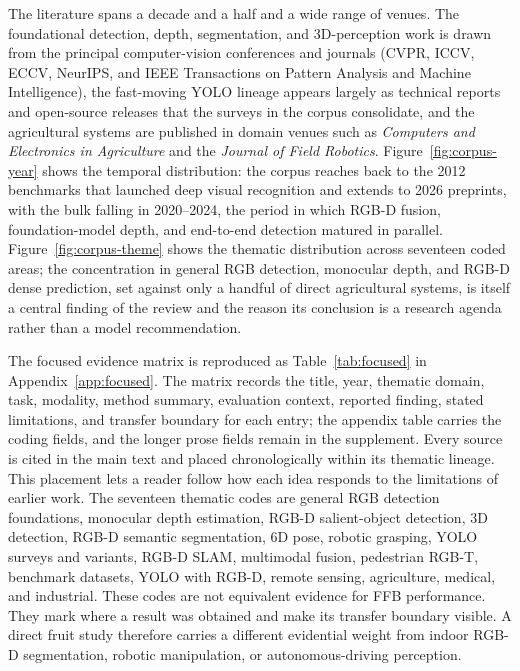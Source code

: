 The literature spans a decade and a half and a wide range of venues. The foundational detection, depth, segmentation, and 3D-perception work is drawn from the principal computer-vision conferences and journals (CVPR, ICCV, ECCV, NeurIPS, and IEEE Transactions on Pattern Analysis and Machine Intelligence), the fast-moving YOLO lineage appears largely as technical reports and open-source releases that the surveys in the corpus consolidate, and the agricultural systems are published in domain venues such as \emph{Computers and Electronics in Agriculture} and the \emph{Journal of Field Robotics}. Figure~\ref{fig:corpus-year} shows the temporal distribution: the corpus reaches back to the 2012 benchmarks that launched deep visual recognition and extends to 2026 preprints, with the bulk falling in 2020--2024, the period in which RGB-D fusion, foundation-model depth, and end-to-end detection matured in parallel. Figure~\ref{fig:corpus-theme} shows the thematic distribution across seventeen coded areas; the concentration in general RGB detection, monocular depth, and RGB-D dense prediction, set against only a handful of direct agricultural systems, is itself a central finding of the review and the reason its conclusion is a research agenda rather than a model recommendation.

The focused evidence matrix is reproduced as Table~\ref{tab:focused} in Appendix~\ref{app:focused}. The matrix records the title, year, thematic domain, task, modality, method summary, evaluation context, reported finding, stated limitations, and transfer boundary for each entry; the appendix table carries the coding fields, and the longer prose fields remain in the supplement. Every source is cited in the main text and placed chronologically within its thematic lineage. This placement lets a reader follow how each idea responds to the limitations of earlier work. The seventeen thematic codes are general RGB detection foundations, monocular depth estimation, RGB-D salient-object detection, 3D detection, RGB-D semantic segmentation, 6D pose, robotic grasping, YOLO surveys and variants, RGB-D SLAM, multimodal fusion, pedestrian RGB-T, benchmark datasets, YOLO with RGB-D, remote sensing, agriculture, medical, and industrial. These codes are not equivalent evidence for FFB performance. They mark where a result was obtained and make its transfer boundary visible. A direct fruit study therefore carries a different evidential weight from indoor RGB-D segmentation, robotic manipulation, or autonomous-driving perception.

